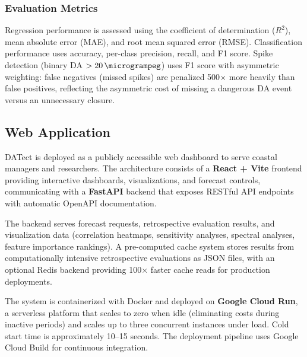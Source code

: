 \documentclass[preprint,12pt,authoryear]{elsarticle}
\begin{document}
\subsubsection{Evaluation Metrics}

Regression performance is assessed using the coefficient of determination ($R^2$), mean absolute error (MAE), and root mean squared error (RMSE). Classification performance uses accuracy, per-class precision, recall, and F1 score. Spike detection (binary DA $> \SI{20}{\microgrampeg}$) uses F1 score with asymmetric weighting: false negatives (missed spikes) are penalized 500$\times$ more heavily than false positives, reflecting the asymmetric cost of missing a dangerous DA event versus an unnecessary closure.

\subsection{Web Application}
\label{sec:webapp}

DATect is deployed as a publicly accessible web dashboard to serve coastal managers and researchers. The architecture consists of a \textbf{React + Vite} frontend providing interactive dashboards, visualizations, and forecast controls, communicating with a \textbf{FastAPI} backend that exposes RESTful API endpoints with automatic OpenAPI documentation.

The backend serves forecast requests, retrospective evaluation results, and visualization data (correlation heatmaps, sensitivity analyses, spectral analyses, feature importance rankings). A pre-computed cache system stores results from computationally intensive retrospective evaluations as JSON files, with an optional Redis backend providing 100$\times$ faster cache reads for production deployments.

The system is containerized with Docker and deployed on \textbf{Google Cloud Run}, a serverless platform that scales to zero when idle (eliminating costs during inactive periods) and scales up to three concurrent instances under load. Cold start time is approximately 10--15 seconds. The deployment pipeline uses Google Cloud Build for continuous integration.
\end{document}

